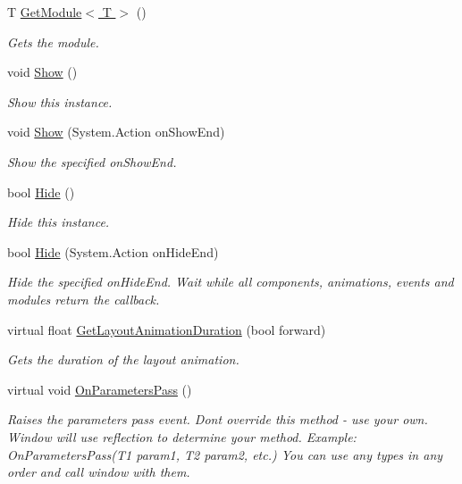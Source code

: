 \begin{DoxyCompactItemize}
T \hyperlink{class_unity_engine_1_1_u_i_1_1_windows_1_1_window_base_a20e15e7d12e794179f5ccadd865804c5}{Get\+Module$<$ T $>$} ()
\begin{DoxyCompactList}\small\item\em Gets the module. \end{DoxyCompactList}\item 
void \hyperlink{class_unity_engine_1_1_u_i_1_1_windows_1_1_window_base_ac66327fe6340171175667db975f4b162}{Show} ()
\begin{DoxyCompactList}\small\item\em Show this instance. \end{DoxyCompactList}\item 
void \hyperlink{class_unity_engine_1_1_u_i_1_1_windows_1_1_window_base_a82a73cfeb4b44bd915e79ead77e33fd5}{Show} (System.\+Action on\+Show\+End)
\begin{DoxyCompactList}\small\item\em Show the specified on\+Show\+End. \end{DoxyCompactList}\item 
bool \hyperlink{class_unity_engine_1_1_u_i_1_1_windows_1_1_window_base_a249ae5824081d5e6834c6564aba51190}{Hide} ()
\begin{DoxyCompactList}\small\item\em Hide this instance. \end{DoxyCompactList}\item 
bool \hyperlink{class_unity_engine_1_1_u_i_1_1_windows_1_1_window_base_a772141af7a73f4e72d6c55bd18ecccb0}{Hide} (System.\+Action on\+Hide\+End)
\begin{DoxyCompactList}\small\item\em Hide the specified on\+Hide\+End. Wait while all components, animations, events and modules return the callback. \end{DoxyCompactList}\item 
virtual float \hyperlink{class_unity_engine_1_1_u_i_1_1_windows_1_1_window_base_aa0b1c8f3e8b81da8c342365ed0fcf49a}{Get\+Layout\+Animation\+Duration} (bool forward)
\begin{DoxyCompactList}\small\item\em Gets the duration of the layout animation. \end{DoxyCompactList}\item 
virtual void \hyperlink{class_unity_engine_1_1_u_i_1_1_windows_1_1_window_base_a5704019a21853e82d8e72677f5b6f63c}{On\+Parameters\+Pass} ()
\begin{DoxyCompactList}\small\item\em Raises the parameters pass event. Don\textquotesingle{}t override this method -\/ use your own. Window will use reflection to determine your method. Example\+: On\+Parameters\+Pass(T1 param1, T2 param2, etc.) You can use any types in any order and call window with them. \end{DoxyCompactList}\item 

\end{DoxyCompactItemize}
